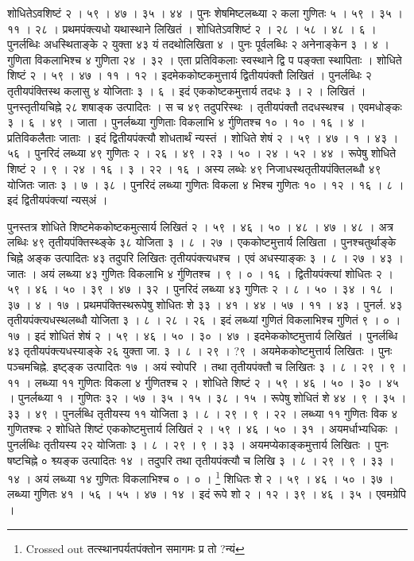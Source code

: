 \documentclass[11pt,a5paper]{book}
\begin{document}
{शोधितेऽवशिष्टं २ । ५९ । ४७ । ३५ । ४४ । पुनः शेषमिष्टलब्ध्या २ कला गुणितः ५ । ५९ । ३५ । ११ । २८ । 
प्रथमपंक्त्यधो यथास्थाने लिखितं । शोधितेऽवशिष्टं २ । २८ । ५८ । ४८ । ६ । 
पुनर्लब्धिः अधस्थिताङ्के २ युक्ता ४३ यं तदथोलिखिता ४ । पुनः पूर्वलब्धिः २ अनेनाङ्केन ३ । ४ । 
गुणिता विकलाभिश्च ४ गुणिता २४ । ३२ । एता प्रतिविकलाः स्वस्थाने द्वि प पङ्क्ता स्थापिताः । 
शोधिते शिष्टं २ । ५९ । ४७ । ११ । १२ । इदमेककोष्टकमुत्तार्य द्वितीयपंक्तौ लिखितं । 
पुनर्लब्धिः २ तृतीयपंक्तिस्थ कलासु ४ योजिताः ३ । ६ । इदं एककोष्टकमुत्तार्य तदधः ३ । २ । 
लिखितं । पुनस्तृतीयचिह्ने २८ शषाङ्क उत्पादितः । स च ४९ तदुपरिस्थः । 
तृतीयपंक्तौ तदधस्थश्च । एवमधोङ्कः ३ । ६ । ४९ । जाता । पुनर्लब्ध्या गुणिताः विकलाभि ४ र्गुणितश्च १० । १० । १६ । ४ । 
प्रतिविकलैताः जाताः । इदं द्वितीयपंक्त्यौ शोधतार्थं न्यस्तं । शोधिते शेषं २ । ५९ । ४७ । १ । ४३ । ५६ । 
पुनरिदं लब्ध्या ४९ गुणितः २ । २६ । ४९ । २३ । ५० । २४ । ५२ । ४४ । 
रूपेषु शोधिते शिष्टं २ । ९ । २४ । १६ । ३ । २२ । १६ । अस्य लब्धेः ४९ निजाधस्थतृतीयपंक्तिलब्धौ ४९ योजितः जातः ३ । ७ । ३८ । 
पुनरिदं लब्ध्या गुणितः विकला ४ भिश्च गुणितः १० । १२ । १६ । ८ । इदं द्वितीयपंक्त्यां न्यस्अं । 




पुनस्तत्र शोधिते शिष्टमेककोष्टकमुत्सार्य लिखितं २ । ५९ । ४६ । ५० । ४८ । ४७ । ४८ । 
अत्र लब्धिः ४९ तृतीयपंक्तिस्थ्ङ्के ३८ योजिता ३ । ८ । २७ । एककोष्टमुत्तार्य लिखिता । 
पुनश्चतुर्थाङ्के चिह्ने अङ्क उत्पादितः ४३ तदुपरि लिखितः तृतीयपंक्त्यधश्च । 
एवं अधस्याङ्कः ३ । ८ । २७ । ४३ । जातः । अयं लब्ध्या ४३ गुणितः विकलाभि ४ र्गुणितश्च । ९ । ० । १६ । 
द्वितीयपंक्त्यां शोधितः २ । ५९ । ४६ । ५० । ३९ । ४७ । ३२ । 
पुनरिदं लब्ध्या ४३ गुणितः २ । ८ । ५० । ३४ । १८ । ३७ । ४ । १७ । 
प्रथमपंक्तिस्थरूपेषु शोधितः शे ३३ । ४१ । ४४ । ५७ । ११ । ४३ । 
पुनर्ल. ४३ तृतीयपंक्त्यधस्थलब्धौ योजिता ३ । ८ । २८ । २६ । 
इदं लब्ध्यां गुणितं विकलाभिश्च  गुणितं ९ । ० । १७ । इदं शोधितं शेषं २ । ५९ । ४६ । ५० । ३० । ४७ । 
इदमेककोष्टमुत्तार्य लिखितं । पुनर्लब्धि ४३ तृतीयपंक्त्यधस्याङ्के २६ युक्ता जा. ३ । ८ । २९ । ?९ । 
अयमेककोष्टमुत्तार्य लिखितः । पुनः पञ्चमचिह्ने. इष्ट्ङ्क उत्पादितः १७ । 
अयं स्वोपरि । तथा तृतीयपंक्तौ च लिखितः ३ । ८ । २९ । ९ । ११ । 
लब्ध्या ११ गुणितः विकला ४ र्गुणितश्च २ । शोधिते शिष्टं २ । ५९ । ४६ । ५० । ३० । ४५ । 
पुनर्लब्ध्या १ । गुणितः ३२ । ५७ । ३५ । १५ । ३८ । १५ । रूपेषु शोधितं शे ४४ । ९ । ३५ । ३३ । ४९ । 
पुनर्लब्धि तृतीयस्य ११ योजिता ३ । ८ । २९ । ९ । २२ । लब्ध्या ११ गुणितः विक ४ गुणितश्चः २ शोधिते शिष्टं एककोष्टमुत्तार्य लिखितं २ । ५९ । ४६ । ५० । ३१ । 
अयमर्धाभ्यधिकः । पुनर्लब्धिः तृतीयस्य २२ योजिताः ३ । ८ । २९ । ९ । ३३ । 
अयमप्येकाङ्कमुत्तार्य लिखितः । पुनः षष्टचिह्ने ० श्व्यङ्क उत्पादितः १४ । तदुपरि तथा तृतीयपंक्त्यौ च लिखि ३ । ८ । २९ । ९ । ३३ । १४ । 
अयं लब्ध्या १४ गुणितः विकलाभिश्च ० । ० । \footnote{Crossed out तत्स्थानपर्यतपंक्तोन समागमः प्र तो ?न्यं} शिधितः शे २ । ५९ । ४६ । ५० । ३७ । 
लब्ध्या गुणितः ४१ । ५६ । ५५ । ४७ । १४ । इदं रूपे शो २ । १२ । ३९ । ४६ । ३५ । एवमग्रेपि ।}   
\end{document}
